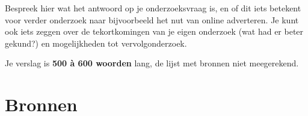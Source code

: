 \documentclass[12pt]{article}
\begin{document}
Bespreek hier wat het antwoord op je onderzoeksvraag is, en of dit iets betekent voor verder onderzoek naar bijvoorbeeld het nut van online adverteren. Je kunt ook iets zeggen over de tekortkomingen van je eigen onderzoek (wat had er beter gekund?) en mogelijkheden tot vervolgonderzoek. 

Je verslag is  \textbf{500 \`a 600 woorden} lang,  de lijst met bronnen niet meegerekend. 

\newpage
\section*{Bronnen}
\end{document}
